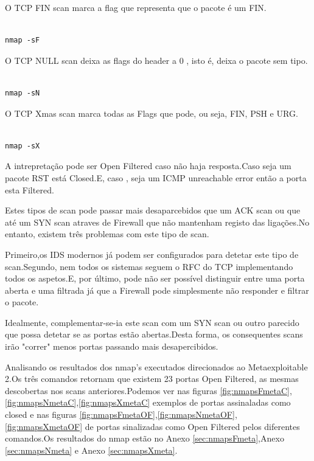O TCP FIN scan marca a flag que representa que o pacote é um FIN.

\begin{lstlisting}

nmap -sF

\end{lstlisting}

O TCP NULL scan deixa as flags do header a 0 , isto é, deixa o pacote sem tipo.

\begin{lstlisting}

nmap -sN

\end{lstlisting}

O TCP Xmas scan marca todas as Flags que pode, ou seja, FIN, PSH e URG.

\begin{lstlisting}

nmap -sX

\end{lstlisting}

A intrepretação pode ser Open Filtered caso não haja resposta.Caso seja um pacote RST está Closed.E, caso , seja um ICMP unreachable error então a porta esta Filtered.

Estes tipos de scan pode passar mais desaparcebidos que um ACK scan ou que até um SYN scan atraves de Firewall que não mantenham registo das ligações.No entanto, existem três problemas com este tipo de scan.

Primeiro,os IDS modernos já podem ser configurados para detetar este tipo de scan.Segundo, nem todos os sistemas seguem o RFC do TCP implementando todos os aspetos.E, por último, pode não ser possível distinguir entre uma porta aberta e uma filtrada já que a Firewall pode simplesmente não responder e filtrar o pacote.

Idealmente, complementar-se-ia este scan com um SYN scan ou outro parecido que possa detetar se as portas estão abertas.Desta forma, os consequentes scans irão "correr" menos portas passando mais desapercibidos.

Analisando os resultados dos nmap's executados direcionados ao Metaexploitable 2.Os três comandos retornam que existem 23 portas Open Filtered, as mesmas descobertas nos scans anteriores.Podemos ver nas figuras \ref{fig:nmapsFmetaC},\ref{fig:nmapsNmetaC},\ref{fig:nmapsXmetaC} exemplos de portas assinaladas como closed e nas figuras \ref{fig:nmapsFmetaOF},\ref{fig:nmapsNmetaOF},\ref{fig:nmapsXmetaOF} de portas sinalizadas como Open Filtered pelos diferentes comandos.Os resultados do nmap estão no Anexo \ref{sec:nmapsFmeta},Anexo \ref{sec:nmapsNmeta} e Anexo \ref{sec:nmapsXmeta}.

